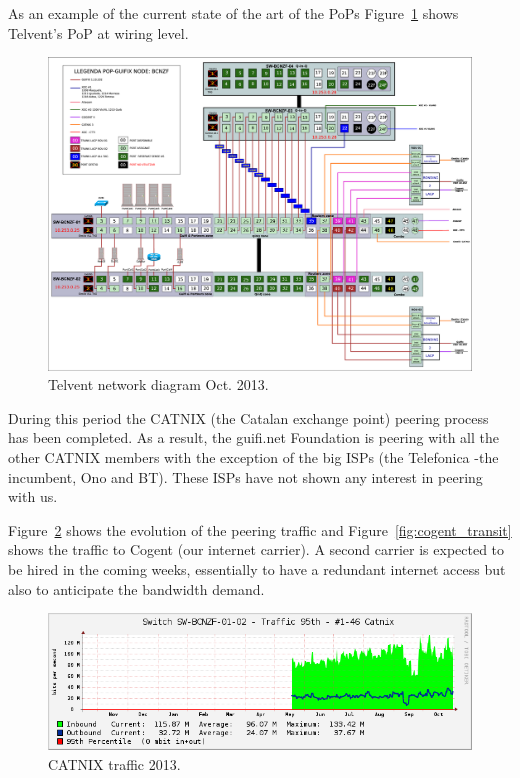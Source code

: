 As an example of the current state of the art of the PoPs Figure~\ref{fig:telvent_diagram} shows Telvent's PoP at wiring level.

\begin{figure}[H]
  \centering
  \includegraphics[width=0.95\linewidth]{sect3/figures/telvent_diagram.eps} 
  \caption[Telvent network diagram]{Telvent network diagram Oct. 2013.}
  \label{fig:telvent_diagram}
\end{figure}


During this period the CATNIX (the Catalan exchange point) peering process has been completed. As a result, the guifi.net Foundation is peering with all the other CATNIX members with the exception of the big ISPs (the Telefonica -the incumbent, Ono and BT). These ISPs have not shown any interest in peering with us.

Figure~\ref{fig:catnix_transit} shows the evolution of the peering traffic and Figure~\ref{fig:cogent_transit} shows the traffic to Cogent (our internet carrier). A second carrier is expected to be hired in the coming weeks, essentially to have a redundant internet access but also to anticipate the bandwidth demand.

\begin{figure}[H]
  \centering
  \includegraphics[width=0.95\linewidth]{sect3/figures/catnix.png} 
  \caption[CATNIX traffic 2013]{CATNIX traffic 2013.}
  \label{fig:catnix_transit}
\end{figure}

